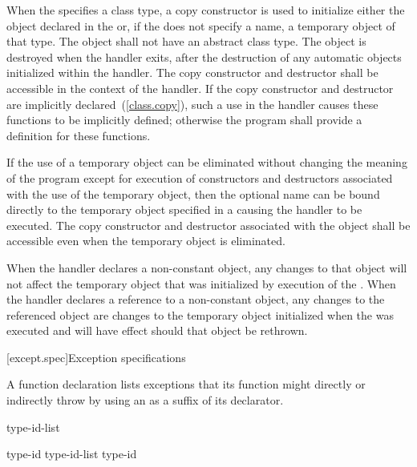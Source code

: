 \pnum
When the  specifies a class type, a copy
constructor is used to initialize either the object declared in the
 or,
if the  does not specify a name, a
temporary object of that type. The object shall not have an abstract class type.
The object is destroyed when the handler exits, after the destruction of
any automatic objects initialized within the handler. The copy constructor
and destructor shall be accessible in the context of the handler. If the
copy constructor and destructor are implicitly declared~(\ref{class.copy}),
such a use in the handler causes these functions to be implicitly defined;
otherwise the program shall provide a definition for these functions.

\pnum
If the use of a temporary object can be eliminated without changing the
meaning of the program except for execution of constructors and destructors
associated with the use of the temporary object, then the optional name
can be bound directly to the temporary object specified in a
 causing the handler to be executed. The copy
constructor and destructor associated with the object shall be accessible
even when the temporary object is eliminated.

\pnum
When the handler declares a non-constant object,
any changes to that object will not affect the temporary object
that was initialized by execution of the
.
When the handler declares a reference to a non-constant object,
any changes to the referenced object are changes to the
temporary object initialized when the
was executed and will have effect should that object be rethrown.%
%

[except.spec]{Exception specifications}%

\pnum
A function declaration lists exceptions
that its function might directly or indirectly throw
by using an
as a suffix of its declarator.

\begin{bnf}
\br
     type-id-list\opt \terminal{)}
\end{bnf}

\begin{bnf}
\br
    type-id\br
    type-id-list \terminal{,} type-id
\end{bnf}

